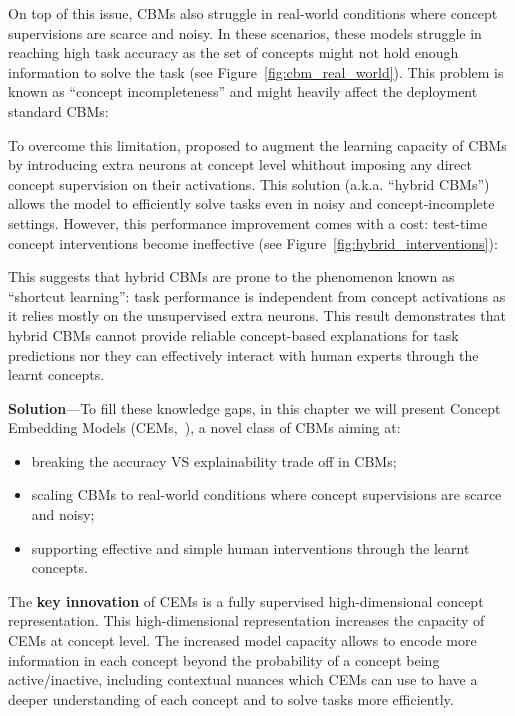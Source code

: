On top of this issue, CBMs also struggle in real-world conditions where concept supervisions are scarce and noisy. In these scenarios, these models struggle in reaching high task accuracy as the set of concepts might not hold enough information to solve the task (see Figure~\ref{fig:cbm_real_world}). This problem is known as ``concept incompleteness'' and might heavily affect the deployment standard CBMs:

To overcome this limitation, \citet{mahinpei2021promises} proposed to augment the learning capacity of CBMs by introducing extra neurons at concept level whithout imposing any direct concept supervision on their activations. This solution (a.k.a. ``hybrid CBMs'') allows the model to efficiently solve tasks even in noisy and concept-incomplete settings. However, this performance improvement comes with a cost: test-time concept interventions become ineffective (see Figure~\ref{fig:hybrid_interventions}):

This suggests that hybrid CBMs are prone to the phenomenon known as ``shortcut learning'': task performance is independent from concept activations as it relies mostly on the unsupervised extra neurons. This result demonstrates that hybrid CBMs cannot provide reliable concept-based explanations for task predictions nor they can effectively interact with human experts through the learnt concepts.

\textbf{Solution}---To fill these knowledge gaps, in this chapter we will present Concept Embedding Models (CEMs,~\citep{zarlenga2022concept}), a novel class of CBMs aiming at:
\begin{itemize}
	\item breaking the accuracy VS explainability trade off in CBMs;
	\item scaling CBMs to real-world conditions where concept supervisions are scarce and noisy;
	\item supporting effective and simple human interventions through the learnt concepts.
\end{itemize}
The \textbf{key innovation} of CEMs is a fully supervised high-dimensional concept representation. This high-dimensional representation increases the capacity of CEMs at concept level. The increased model capacity allows to encode more information in each concept beyond the probability of a concept being active/inactive, including contextual nuances which CEMs can use to have a deeper understanding of each concept and to solve tasks more efficiently.

